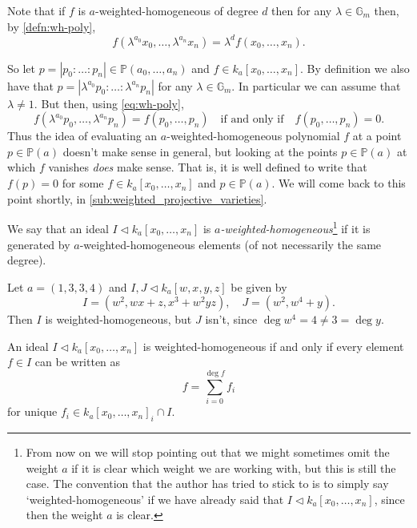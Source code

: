 \documentclass[10pt,notitlepage]{article}
\numberwithin{equation}{subsection}
\newcommand{\pee}{\mathbb{P}}
\newcommand{\gm}{\mathbb{G}_m}
\newcommand{\kazn}{k_a[x_0,\ldots,x_n]}
\newcommand{\pazn}{\pee(a_0,\ldots,a_n)}
\begin{document}
Note that if $f$ is $a$-weighted-homogeneous of degree $d$ then for any $\lambda\in\gm$ then, by \cref{defn:wh-poly},
\begin{equation}\label{eq:wh-poly}
    f(\lambda^{a_0}x_0,\ldots,\lambda^{a_n}x_n) = \lambda^d f(x_0,\ldots,x_n).
\end{equation}

So let $p=|p_0:\ldots:p_n|\in\pazn$ and $f\in \kazn$.
By definition we also have that $p=|\lambda^{a_0} p_0:\ldots:\lambda^{a_n} p_n|$ for any $\lambda\in\gm$.
In particular we can assume that $\lambda\neq1$.
But then, using \cref{eq:wh-poly},
\[f(\lambda^{a_0}p_0,\ldots,\lambda^{a_n}p_n) = f(p_0,\ldots,p_n) \quad\text{if and only if}\quad f(p_0,\ldots,p_n)=0.\]
Thus the idea of evaluating an $a$-weighted-homogeneous polynomial $f$ at a point $p\in\pee(a)$ doesn't make sense in general, but looking at the points $p\in\pee(a)$ at which $f$ vanishes \emph{does} make sense.
That is, it is well defined to write that $f(p)=0$ for some $f\in \kazn$ and $p\in\pee(a)$.
We will come back to this point shortly, in \cref{sub:weighted_projective_varieties}.

\begin{definition}
    We say that an ideal $I\triangleleft \kazn$ is \emph{$a$-weighted-homogeneous}\footnote{%
        From now on we will stop pointing out that we might sometimes omit the weight $a$ if it is clear which weight we are working with, but this is still the case.
        The convention that the author has tried to stick to is to simply say `weighted-homogeneous' if we have already said that $I\triangleleft\kazn$, since then the weight $a$ is clear.%
    } if it is generated by $a$-weighted-homogeneous elements (of not necessarily the same degree).
\end{definition}

\begin{example}
    Let $a=(1,3,3,4)$ and $I,J\triangleleft k_a[w,x,y,z]$ be given by
    \[I = (w^2, wx+z, x^3+w^2yz),\quad J = (w^2, w^4+y).\]
    Then $I$ is weighted-homogeneous, but $J$ isn't, since $\deg w^4=4\neq 3=\deg y$.
\end{example}

\begin{lemma}\label{lem:equiv-def-wh-ideals}
    An ideal $I\triangleleft\kazn$ is weighted-homogeneous if and only if every element $f\in I$ can be written as
        \[f=\sum_{i=0}^{\deg f} f_i\]
    for unique $f_i\in\kazn_i\cap I$.
\end{lemma}
\end{document}
